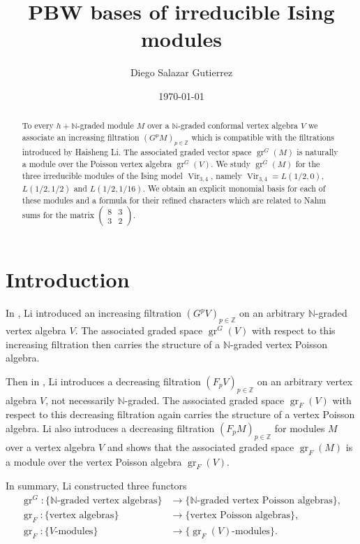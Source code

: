 \documentclass[12pt, reqno]{amsart}
\theoremstyle{remark}
\DeclareMathOperator{\Vir}{Vir}
\DeclareMathOperator{\gr}{gr}
\begin{document}
\title{PBW bases of irreducible Ising modules}
\author{Diego Salazar Gutierrez}
\address{Instituto de Matemática Pura e Aplicada, Rio de Janeiro, RJ, Brazil}
\date{\today}
\maketitle

\begin{abstract}
  To every $h + \mathbb{N}$-graded module $M$ over a $\mathbb{N}$-graded conformal vertex algebra $V$ we associate an increasing filtration $(G^pM)_{p \in \mathbb{Z}}$ which is compatible with the filtrations introduced by Haisheng Li.
  The associated graded vector space $\gr^G(M)$ is naturally a module over the Poisson vertex algebra $\gr^G(V)$.
  We study $\gr^G(M)$ for the three irreducible modules of the Ising model $\Vir_{3, 4}$, namely $\Vir_{3,4} = L(1/2, 0)$, $L(1/2, 1/2)$ and $L(1/2, 1/16)$.
  We obtain an explicit monomial basis for each of these modules and a formula for their refined characters which are related to Nahm sums for the matrix $\left(\begin{smallmatrix} 8 & 3 \\ 3 & 2 \end{smallmatrix}\right)$.
\end{abstract}

\section{Introduction}
\label{sec:introduction}

In \cite{li_vertex_2004}, Li introduced an increasing filtration $(G^pV)_{p\in \mathbb{Z}}$ on an arbitrary $\mathbb{N}$-graded vertex algebra $V$.
The associated graded space $\gr^G(V)$ with respect to this increasing filtration then carries the structure of a $\mathbb{N}$-graded vertex Poisson algebra.

Then in \cite{li_abelianizing_2005}, Li introduces a decreasing filtration $(F_pV)_{p\in \mathbb{Z}}$ on an arbitrary vertex algebra $V$, not necessarily $\mathbb{N}$-graded.
The associated graded space $\gr_F(V)$ with respect to this decreasing filtration again carries the structure of a vertex Poisson algebra.
Li also introduces a decreasing filtration $(F_pM)_{p\in \mathbb{Z}}$ for modules $M$ over a vertex algebra $V$ and shows that the associated graded space $\gr_F(M)$ is a module over the vertex Poisson algebra $\gr_F(V)$.

In summary, Li constructed three functors
\begin{align*}
  \gr^G: \{\text{$\mathbb{N}$-graded vertex algebras}\} &\to \{\text{$\mathbb{N}$-graded vertex Poisson algebras}\}, \\
  \gr_F: \{\text{vertex algebras}\} &\to \{\text{vertex Poisson algebras}\}, \\
  \gr_F: \{\text{$V$-modules}\} &\to \{\text{$\gr_F(V)$-modules}\}.
\end{align*}
\end{document}
